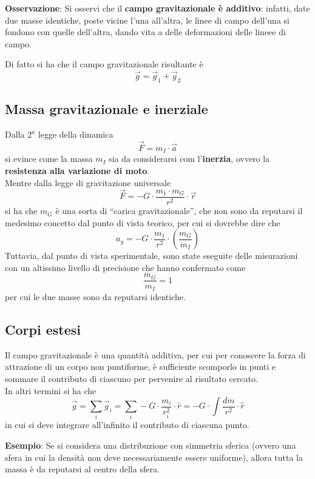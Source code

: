 \documentclass[a4paper]{extarticle}
\newcommand{\quotes}[1]{``#1''}
\begin{document}
\vspace{1em}
\noindent
\textbf{Osservazione}: Si osservi che il \textbf{campo gravitazionale è additivo}: infatti, date due masse identiche, poste vicine l'una all'altra, le linee di campo dell'una si fondono con quelle dell'altra, dando vita a delle deformazioni delle lineee di campo.

Di fatto si ha che il campo gravitazionale risultante è
\[\vec{g} = \vec{g}_1 + \vec{g}_2\]

\vspace{1em}
\subsection{Massa gravitazionale e inerziale}
Dalla $2^a$ legge della dinamica
\[\vec{F} = m_I \cdot \vec{a}\]
si evince come la massa $m_I$ sia da considerarsi com l'\textbf{inerzia}, ovvero la \textbf{resistenza alla variazione di moto}.\\
Mentre dalla legge di gravitazione universale
\[\vec{F} = - G \cdot \frac{m_1 \cdot m_G}{r^2} \cdot \vec{r}\]
si ha che $m_G$ è una sorta di \quotes{carica gravitazionale}, che non sono da reputarsi il medesimo concetto dal punto di vista teorico, per cui si dovrebbe dire che
\[a_y = -G \cdot \frac{m_1}{r^2} \cdot \left(\frac{m_G}{m_I}\right)\]
Tuttavia, dal punto di vista sperimentale, sono state eseguite delle misurazioni con un altissimo livello di precisione che hanno confermato come
\[\frac{m_G}{m_I} = 1\]
per cui le due masse sono da reputarsi identiche.

\vspace{1em}
\subsection{Corpi estesi}
Il campo gravitazionale è una quantità additiva, per cui per conoscere la forza di attrazione di un corpo non puntiforme, è sufficiente scomporlo in punti e sommare il contributo di ciascuno per pervenire al risultato cercato.\\
In altri termini si ha che
\[\boxed{\vec{g} = \sum_i \vec{g}_i = \sum_i - G \cdot \frac{m_i}{r_i^2} \cdot \hat{r} = -G \cdot \int \frac{dm}{r^2} \cdot \hat{r}}\]
in cui si deve integrare all'infinito il contributo di ciascuna punto.

\vspace{1em}
\noindent
\textbf{Esempio}: Se si considera una distribuzione con simmetria sferica (ovvero una sfera in cui la densità non deve necessariamente essere uniforme), allora tutta la massa è da reputarsi al centro della sfera.
\end{document}
